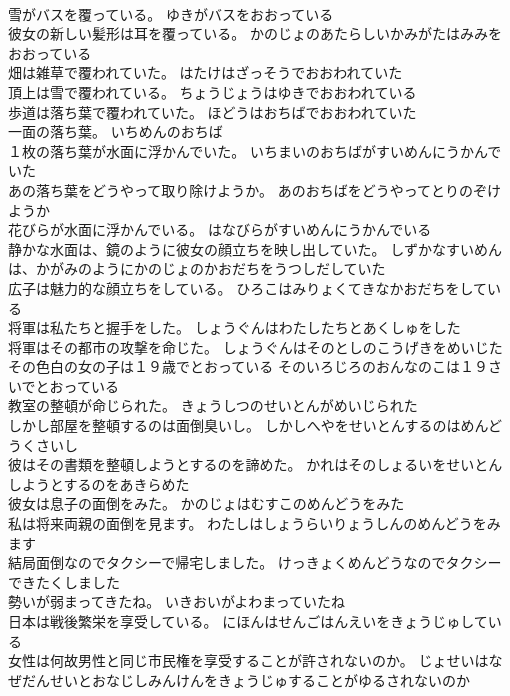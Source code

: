 \documentclass[8pt]{extreport}
\begin{document}
\begin{CJK}{UTF8}{min}
\\	雪がバスを覆っている。	ゆきがバスをおおっている 
\\	彼女の新しい髪形は耳を覆っている。	かのじょのあたらしいかみがたはみみをおおっている 
\\	畑は雑草で覆われていた。	はたけはざっそうでおおわれていた 
\\	頂上は雪で覆われている。	ちょうじょうはゆきでおおわれている 
\\	歩道は落ち葉で覆われていた。	ほどうはおちばでおおわれていた 
\\	一面の落ち葉。	いちめんのおちば 
\\	１枚の落ち葉が水面に浮かんでいた。	いちまいのおちばがすいめんにうかんでいた 
\\	あの落ち葉をどうやって取り除けようか。	あのおちばをどうやってとりのぞけようか 
\\	花びらが水面に浮かんでいる。	はなびらがすいめんにうかんでいる 
\\	静かな水面は、鏡のように彼女の顔立ちを映し出していた。	しずかなすいめんは、かがみのようにかのじょのかおだちをうつしだしていた 
\\	広子は魅力的な顔立ちをしている。	ひろこはみりょくてきなかおだちをしている 
\\	将軍は私たちと握手をした。	しょうぐんはわたしたちとあくしゅをした 
\\	将軍はその都市の攻撃を命じた。	しょうぐんはそのとしのこうげきをめいじた 
\\	その色白の女の子は１９歳でとおっている	そのいろじろのおんなのこは１９さいでとおっている 
\\	教室の整頓が命じられた。	きょうしつのせいとんがめいじられた 
\\	しかし部屋を整頓するのは面倒臭いし。	しかしへやをせいとんするのはめんどうくさいし 
\\	彼はその書類を整頓しようとするのを諦めた。	かれはそのしょるいをせいとんしようとするのをあきらめた 
\\	彼女は息子の面倒をみた。	かのじょはむすこのめんどうをみた 
\\	私は将来両親の面倒を見ます。	わたしはしょうらいりょうしんのめんどうをみます 
\\	結局面倒なのでタクシーで帰宅しました。	けっきょくめんどうなのでタクシーできたくしました 
\\	勢いが弱まってきたね。	いきおいがよわまっていたね 
\\	日本は戦後繁栄を享受している。	にほんはせんごはんえいをきょうじゅしている 
\\	女性は何故男性と同じ市民権を享受することが許されないのか。	じょせいはなぜだんせいとおなじしみんけんをきょうじゅすることがゆるされないのか 

\end{CJK}
\end{document}
